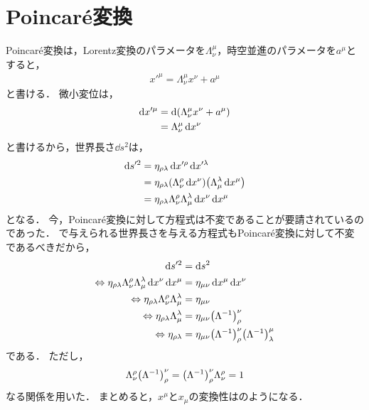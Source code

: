 \documentclass{report}
\begin{document}
  \section{Poincar\'e変換}
    Poincar\'e変換は，Lorentz変換のパラメータを$\Lambda_{\nu}^{\mu}$，時空並進のパラメータを$a^{\mu}$とすると，
    \begin{align}
      x'^{\mu} = \Lambda_{\nu}^{\mu}x^{\nu} + a^{\mu}
    \end{align}
    と書ける．
    微小変位は，
    \begin{align}
      \dd{x'^{\mu}} &= \dd{\qty(\Lambda_{\nu}^{\mu}x^{\nu} + a^{\mu})} \\ 
      &= \Lambda_{\nu}^{\mu}\dd{x^{\nu}}
    \end{align}
    と書けるから，世界長さ$\dd{s^2}$は，
    \begin{align}
      \dd{s'^2} &= \eta_{\rho\lambda}\dd{x'^{\rho}}\dd{x'^{\lambda}} \\ 
      &= \eta_{\rho\lambda}\qty(\Lambda_{\nu}^{\rho}\dd{x^{\nu}})\qty(\Lambda_{\mu}^{\lambda}\dd{x^{\mu}}) \\ 
      &= \eta_{\rho\lambda}\Lambda_{\nu}^{\rho}\Lambda_{\mu}^{\lambda}\dd{x^{\nu}}\dd{x^{\mu}}
    \end{align}
    となる．
    今，Poincar\'e変換に対して方程式は不変であることが要請されているのであった．
    で与えられる世界長さを与える方程式もPoincar\'e変換に対して不変であるべきだから，
    \begin{align}
      \dd{s'^2} &= \dd{s^2} \\ 
      \Leftrightarrow \eta_{\rho\lambda}\Lambda_{\nu}^{\rho}\Lambda_{\mu}^{\lambda}\dd{x^{\nu}}\dd{x^{\mu}} &= \eta_{\mu\nu}\dd{x^{\mu}}\dd{x^{\nu}} \\ 
      \Leftrightarrow \eta_{\rho\lambda}\Lambda_{\nu}^{\rho}\Lambda_{\mu}^{\lambda} &= \eta_{\mu\nu} \\ 
      \Leftrightarrow \eta_{\rho\lambda}\Lambda_{\mu}^{\lambda} &= \eta_{\mu\nu}\qty(\Lambda^{-1})_{\rho}^{\nu}\label{eta-lambda} \\ 
      \Leftrightarrow \eta_{\rho\lambda} &= \eta_{\mu\nu}\qty(\Lambda^{-1})_{\rho}^{\nu}\qty(\Lambda^{-1})_{\lambda}^{\mu}
    \end{align}
    である．
    ただし，
    \begin{align}
      \Lambda_{\nu}^{\rho}\qty(\Lambda^{-1})_{\rho}^{\nu} = \qty(\Lambda^{-1})_{\rho}^{\nu}\Lambda_{\nu}^{\rho} = 1
    \end{align}
    なる関係を用いた．
    まとめると，$x^{\mu}$と$x_{\mu}$の変換性はのようになる．
\end{document}
